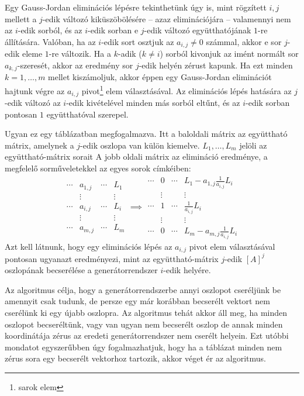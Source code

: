\documentclass[9pt, a4paper, showtrims]{memoir}
\theoremstyle{plain}
\theoremstyle{remark}
\theoremstyle{definition}
\begin{document}
Egy Gauss-Jordan eliminációs  lépésre tekinthetünk úgy is,
mint rögzített $i,j$ mellett a $j$-edik változó kiküszöbölésére
-- azaz eliminációjára -- 
valamennyi nem az $i$-edik sorból,
és az $i$-edik sorban e $j$-edik változó együtthatójának $1$-re állítására.
Valóban,
ha az $i$-edik sort osztjuk az $a_{i,j}\neq 0$ számmal, akkor e sor $j$-edik
eleme $1$-re változik.
Ha a $k$-adik ($k\neq i$) sorból kivonjuk az imént normált sor
$a_{k,j}$-szeresét, akkor az eredmény sor $j$-edik helyén zérust kapunk.
Ha ezt minden $k=1,\dots,m$ mellet kiszámoljuk, akkor éppen egy Gauss-Jordan
eliminációt hajtunk végre az $a_{i,j}$ pivot\footnote{sarok elem} elem választásával.
Az eliminációs lépés hatására az $j$-edik változó az $i$-edik kivételével
minden más sorból eltűnt, és az $i$-edik sorban pontosan $1$ együtthatóval szerepel.

Ugyan ez egy táblázatban megfogalmazva. 
Itt a baloldali mátrix az együttható mátrix, amelynek
a $j$-edik oszlopa van külön kiemelve.
$L_1,\dots,L_m$ jelöli az együttható-mátrix sorait
A jobb oldali mátrix az elimináció eredménye, a megfelelő sorműveletekkel az egyes sorok
címkéiben:
\[
    \begin{array}{ccc|c}
        \cdots&a_{1,j}&\cdots&L_1\\
        &\vdots&       &\vdots\\
        \cdots&\boxed{a_{i,j}}&\cdots&L_i\\
        &\vdots&       &\vdots\\
        \cdots&a_{m,j}&\cdots&L_m
    \end{array}
    \implies
    \begin{array}{ccc|c}
        \cdots&0&\cdots&L_1-a_{1,j}\frac{1}{a_{i,j}}L_i\\
        &\vdots&       &\vdots\\
        \cdots&1&\cdots&\frac{1}{a_{i,j}}L_i\\
        &\vdots&       &\vdots\\
        \cdots&0&\cdots&L_m-a_{m,j}\frac{1}{a_{i,j}}L_i
    \end{array}
\]
Azt kell látnunk, hogy egy eliminációs lépés az $a_{i,j}$ pivot elem választásával pontosan ugyanazt eredményezi, 
mint az együttható-mátrix $j$-edik $\left[ A \right]^j$ oszlopának becserélése a generátorrendszer $i$-edik helyére. 

Az algoritmus célja, hogy
a generátorrendszerbe annyi oszlopot cseréljünk be amennyit csak tudunk, 
de persze egy már korábban becserélt vektort nem cserélünk ki egy újabb oszlopra.
Az algoritmus tehát akkor áll meg,
ha minden oszlopot becseréltünk, 
vagy van ugyan nem becserélt oszlop de annak minden koordinátája zérus az eredeti generátorrendszer nem cserélt helyein.
Ezt utóbbi mondatot egyszerűbben úgy fogalmazhatjuk, 
hogy ha a táblázat minden nem zérus sora egy becserélt vektorhoz tartozik,
akkor véget ér az algoritmus.
\end{document}
